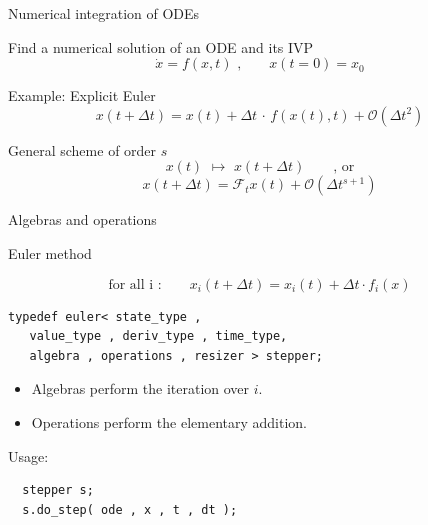 \documentclass{beamer}
\newcommand{\heading}[1]{\centerline{\Large #1} \vspace{0.5em}}
\begin{document}
\begin{frame}
  
 \heading{Numerical integration of ODEs}
  
\vspace{4ex}
    Find a numerical solution of an ODE and its IVP
    \[ \dot{x} = f(x,t) \,\,\textrm{,} \quad \quad x(t=0) = x_0\]

   \vspace{2ex}

   Example: Explicit Euler
   \[ x(t + \Delta t ) = x(t) + \Delta t \,\cdot\, f(x(t),t) + \mathcal{O}(\Delta t^2)\]

   \vspace{2ex}

   General scheme of order $s$
    \[ x(t) \,\, \mapsto \,\, x(t+\Delta t) \quad \quad \text{, or}\]
    \[x(t + \Delta t) = \mathcal{F}_t x(t) + \mathcal{O}(\Delta t^{s+1})\]

\end{frame}





\begin{frame}[fragile]

 \heading{Algebras and operations}

 \vspace{2ex}

Euler method

$$\text{for all i :}  \quad \quad x_i(t+\Delta t) = x_i(t) + \Delta t \cdot f_i(x)$$

\vspace{2ex}

\begin{lstlisting}
typedef euler< state_type ,
   value_type , deriv_type , time_type,
   algebra , operations , resizer > stepper; 
\end{lstlisting}


\begin{itemize}
\item Algebras perform the iteration over $i$.
\item Operations perform the elementary addition.
\end{itemize}

\vspace{2ex}

Usage:

\begin{lstlisting}
  stepper s;
  s.do_step( ode , x , t , dt );
\end{lstlisting}

\end{frame}
\end{document}
